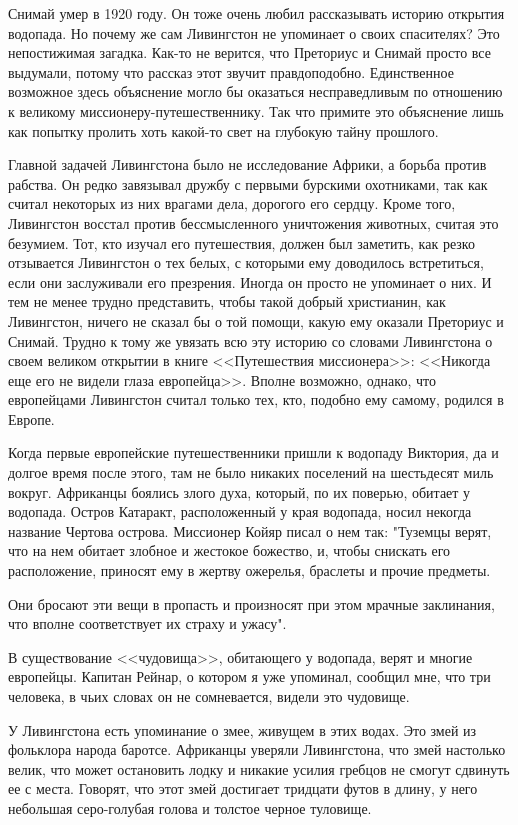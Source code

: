 \documentclass[12pt,a4paper,twoside,openany,svgnames]{memoir}
\begin{document}
Снимай умер в 1920 году. Он тоже очень любил рассказывать историю открытия водопада. Но почему же сам Ливингстон не упоминает о своих спасителях? Это непостижимая загадка. Как-то не верится, что Преториус и Снимай просто все выдумали, потому что рассказ этот звучит правдоподобно. Единственное возможное здесь объяснение могло бы оказаться несправедливым по отношению к великому миссионеру-путешественнику. Так что примите это объяснение лишь как попытку пролить хоть какой-то свет на глубокую тайну прошлого.

Главной задачей Ливингстона было не исследование Африки, а борьба против рабства. Он редко завязывал дружбу с первыми бурскими охотниками, так как считал некоторых из них врагами дела, дорогого его сердцу. Кроме того, Ливингстон восстал против бессмысленного уничтожения животных, считая это безумием. Тот, кто изучал его путешествия, должен был заметить, как резко отзывается Ливингстон о тех белых, с которыми ему доводилось встретиться, если они заслуживали его презрения. Иногда он просто не упоминает о них. И тем не менее трудно представить, чтобы такой добрый христианин, как Ливингстон, ничего не сказал бы о той помощи, какую ему оказали Преториус и Снимай. Трудно к тому же увязать всю эту историю со словами Ливингстона о своем великом открытии в книге <<Путешествия миссионера>>: <<Никогда еще его не видели глаза европейца>>. Вполне возможно, однако, что европейцами Ливингстон считал только тех, кто, подобно ему самому, родился в Европе.

Когда первые европейские путешественники пришли к водопаду Виктория, да и долгое время после этого, там не было никаких поселений на шестьдесят миль вокруг. Африканцы боялись злого духа, который, по их поверью, обитает у водопада. Остров Катаракт, расположенный у края водопада, носил некогда название Чертова острова. Миссионер Койяр писал о нем так: "Туземцы верят, что на нем обитает злобное и жестокое божество, и, чтобы снискать его расположение, приносят ему в жертву ожерелья, браслеты и прочие предметы.

Они бросают эти вещи в пропасть и произносят при этом мрачные заклинания, что вполне соответствует их страху и ужасу".

В существование <<чудовища>>, обитающего у водопада, верят и многие европейцы. Капитан Рейнар, о котором я уже упоминал, сообщил мне, что три человека, в чьих словах он не сомневается, видели это чудовище.

У Ливингстона есть упоминание о змее, живущем в этих водах. Это змей из фольклора народа баротсе. Африканцы уверяли Ливингстона, что змей настолько велик, что может остановить лодку и никакие усилия гребцов не смогут сдвинуть ее с места. Говорят, что этот змей достигает тридцати футов в длину, у него небольшая серо-голубая голова и толстое черное туловище.
\end{document}
